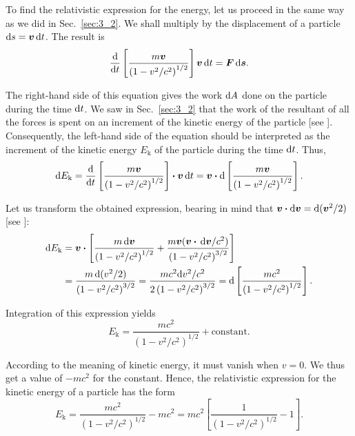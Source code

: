\noindent
To find the relativistic expression for the energy, let us proceed in the same way as we did in Sec.~\ref{sec:3_2}. We shall multiply  by the displacement of a particle $\mathrm{d} s=\boldsymbol{v}\,\mathrm{d} t$. The result is
\begin{equation*}
	\frac{\mathrm{d}}{\mathrm{d} t}\left[\frac{m\boldsymbol{v}}{\left(1-v^2/c^2\right)^{1/2}}\right]\boldsymbol{v}\,\mathrm{d} t = \boldsymbol{F}\,\mathrm{d}\boldsymbol{s}.
\end{equation*}

\noindent
The right-hand side of this equation gives the work $\mathrm{d} A$ done on the particle during the time $\mathrm{d} t$. We saw in Sec.~\ref{sec:3_2} that the work of the resultant of all the forces is spent on an increment of the kinetic energy of the particle [see ]. Consequently, the left-hand side of the equation should be interpreted as the increment of the kinetic energy $E_{\text{k}}$ of the particle during the time $\mathrm{d} t$. Thus,
\begin{equation*}
	\mathrm{d} E_{\text{k}} = \frac{\mathrm{d}}{\mathrm{d} t}\left[\frac{m\boldsymbol{v}}{\left(1-v^2/c^2\right)^{1/2}}\right]\boldsymbol{\cdot}\boldsymbol{v}\,\mathrm{d} t = \boldsymbol{v}\boldsymbol{\cdot} \mathrm{d}\left[\frac{m\boldsymbol{v}}{\left(1-v^2/c^2\right)^{1/2}}\right].
\end{equation*}

Let us transform the obtained expression, bearing in mind that $\boldsymbol{v}\boldsymbol{\cdot}\mathrm{d}\boldsymbol{v}=\mathrm{d}(\boldsymbol{v}^2/2)$ [see ]:
\begin{align*}
	\mathrm{d} E_{\text{k}} &= \boldsymbol{v}\boldsymbol{\cdot} \left[\frac{m\,\mathrm{d}\boldsymbol{v}}{\left(1-v^2/c^2\right)^{1/2}} +  \frac{m\boldsymbol{v}(\boldsymbol{v}\boldsymbol{\cdot}\,\mathrm{d}\boldsymbol{v}/c^2)}{\left(1-v^2/c^2\right)^{3/2}}\right]\\
	& = \frac{m\,\mathrm{d}(v^2/2)}{\left(1-v^2/c^2\right)^{3/2}} = \frac{mc^2\mathrm{d} v^2/c^2}{2\left(1-v^2/c^2\right)^{3/2}} = \mathrm{d}\left[\frac{mc^2}{\left(1-v^2/c^2\right)^{1/2}}\right].
\end{align*}

\noindent
Integration of this expression yields
\begin{equation}\label{eq:8_38}
	E_{\text{k}} = \frac{mc^2}{\left(1-v^2/c^2\right)^{1/2}} + \text{constant}.
\end{equation}

\noindent
According to the meaning of kinetic energy, it must vanish when $v=0$. We thus get a value of $-mc^2$ for the constant. Hence, the relativistic expression for the kinetic energy of a particle has the form
\begin{equation}\label{eq:8_39}
	E_{\text{k}} = \frac{mc^2}{\left(1-v^2/c^2\right)^{1/2}} - mc^2 = mc^2\left[\frac{1}{\left(1-v^2/c^2\right)^{1/2}} - 1\right].
\end{equation}

